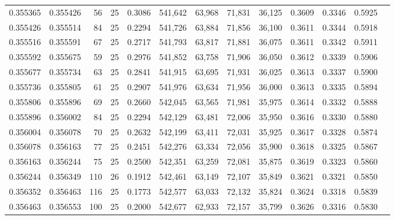 \begin{tabular}{rrrrrrrrrrrrr}
0.355365 & 0.355426 &    56 &  25 &                                     0.3086 & 541,642 &  63,968 &  71,831 &  36,125 & 0.3609 & 0.3346 & 0.5925 \\
0.355426 & 0.355514 &    84 &  25 &                                     0.2294 & 541,726 &  63,884 &  71,856 &  36,100 & 0.3611 & 0.3344 & 0.5918 \\
0.355516 & 0.355591 &    67 &  25 &                                     0.2717 & 541,793 &  63,817 &  71,881 &  36,075 & 0.3611 & 0.3342 & 0.5911 \\
0.355592 & 0.355675 &    59 &  25 &                                     0.2976 & 541,852 &  63,758 &  71,906 &  36,050 & 0.3612 & 0.3339 & 0.5906 \\
0.355677 & 0.355734 &    63 &  25 &                                     0.2841 & 541,915 &  63,695 &  71,931 &  36,025 & 0.3613 & 0.3337 & 0.5900 \\
0.355736 & 0.355805 &    61 &  25 &                                     0.2907 & 541,976 &  63,634 &  71,956 &  36,000 & 0.3613 & 0.3335 & 0.5894 \\
0.355806 & 0.355896 &    69 &  25 &                                     0.2660 & 542,045 &  63,565 &  71,981 &  35,975 & 0.3614 & 0.3332 & 0.5888 \\
0.355896 & 0.356002 &    84 &  25 &                                     0.2294 & 542,129 &  63,481 &  72,006 &  35,950 & 0.3616 & 0.3330 & 0.5880 \\
0.356004 & 0.356078 &    70 &  25 &                                     0.2632 & 542,199 &  63,411 &  72,031 &  35,925 & 0.3617 & 0.3328 & 0.5874 \\
0.356078 & 0.356163 &    77 &  25 &                                     0.2451 & 542,276 &  63,334 &  72,056 &  35,900 & 0.3618 & 0.3325 & 0.5867 \\
0.356163 & 0.356244 &    75 &  25 &                                     0.2500 & 542,351 &  63,259 &  72,081 &  35,875 & 0.3619 & 0.3323 & 0.5860 \\
0.356244 & 0.356349 &   110 &  26 &                                     0.1912 & 542,461 &  63,149 &  72,107 &  35,849 & 0.3621 & 0.3321 & 0.5850 \\
0.356352 & 0.356463 &   116 &  25 &                                     0.1773 & 542,577 &  63,033 &  72,132 &  35,824 & 0.3624 & 0.3318 & 0.5839 \\
0.356463 & 0.356553 &   100 &  25 &                                     0.2000 & 542,677 &  62,933 &  72,157 &  35,799 & 0.3626 & 0.3316 & 0.5830 \\

\end{tabular}
